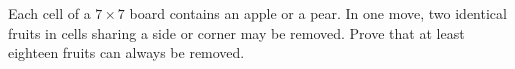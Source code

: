 Each cell of a $7\times7$ board contains an apple or a pear. In one move, two identical fruits in cells sharing a side or corner may be removed. Prove that at least eighteen fruits can always be removed.
